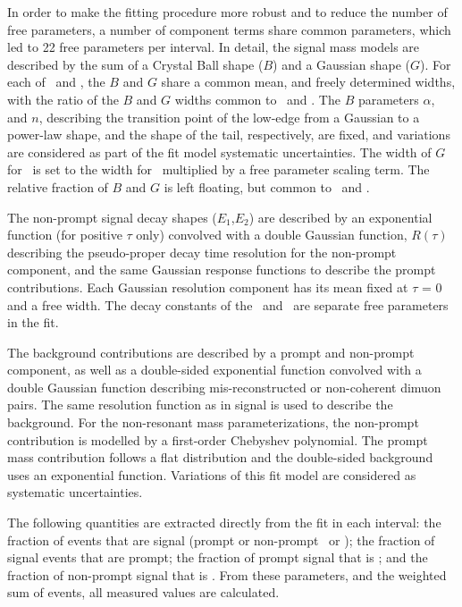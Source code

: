 In order to make the fitting procedure more robust and to reduce the number of free parameters, a number of component terms share common parameters, 
which led to 22 free parameters per interval.
In detail, the signal mass models are described by the sum of a Crystal Ball shape ($B$) and a Gaussian shape ($G$). For each
of \jpsi\ and \psiprime, the $B$ and $G$ share a common mean, and freely determined widths, 
with the ratio of the $B$ and $G$ widths common to \jpsi\ and \psiprime.
The $B$ parameters $\alpha$, and $n$, describing the transition point of the low-edge from a Gaussian to a power-law 
shape, and the shape of the tail, respectively, are fixed, and variations are considered as part of the fit model
systematic uncertainties.
The width of $G$ for \psiprime\ is set to the width for \jpsi\ multiplied by a free parameter scaling term.
The relative fraction of $B$ and $G$ is left floating, but common to \jpsi\ and \psiprime.

The non-prompt signal decay shapes ($E_1$,$E_2$) are described by an exponential function (for positive $\tau$ only) convolved with a
double Gaussian function, $R(\tau)$ describing the pseudo-proper decay time resolution for the non-prompt component, 
and the same Gaussian response functions to
describe the prompt contributions. 
Each Gaussian resolution component has its mean fixed at $\tau$ = 0 and a free width.
The decay constants of the \jpsi\ and \psiprime\ are separate free parameters in the fit.

The background contributions are described by a prompt and non-prompt component, as well as a double-sided exponential function
convolved with a double Gaussian function describing mis-reconstructed or non-coherent dimuon pairs. 
The same resolution function as in signal is used to describe the background. For the non-resonant mass
parameterizations, the non-prompt contribution is modelled by a first-order Chebyshev polynomial. The prompt mass
contribution follows a flat distribution and the double-sided background uses an exponential function.
Variations of this fit model are considered as systematic uncertainties.

The following quantities are extracted directly from the fit in each interval:
the fraction of events that are signal (prompt or non-prompt \jpsi\ or \psiprime); the fraction of signal events that are prompt;
the fraction of prompt signal that is \psiprime; and the fraction of non-prompt signal that is \psiprime. From these
parameters, and the weighted sum of events, all measured values are calculated.


